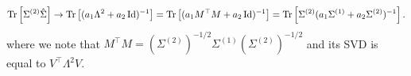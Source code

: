 \[ \operatorname{Tr}\left[\Sigma^{(2)} \hat{\Sigma}\right] \rightarrow \operatorname{Tr}\left[(a_1 \Lambda^2 + a_2\operatorname{Id})^{-1}\right] = \operatorname{Tr}\left[(a_1 M^{\top}M + a_2 \operatorname{Id})^{-1}\right] = \operatorname{Tr}\left[\Sigma^{(2)} (a_1 \Sigma^{(1)} + a_2 \Sigma^{(2)})^{-1}\right]. \]
where we note that $M^\top M = (\Sigma^{(2)})^{-1/2} \Sigma^{(1)} (\Sigma^{(2)})^{-1/2}$ and its SVD is equal to $V^{\top}\Lambda^2 V$.

